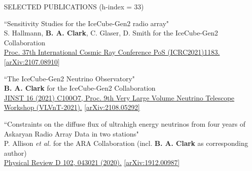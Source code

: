 \documentclass{resume} %
\begin{document}
\begin{rSection}{SELECTED PUBLICATIONS (h-index = 33)}
\begin{etaremune}

  \item ``Sensitivity Studies for the IceCube-Gen2 radio array" \\
 S. Hallmann, \textbf{B. A. Clark}, C. Glaser, D. Smith for the IceCube-Gen2 Collaboration \\ \href{https://doi.org/10.22323/1.395.1183}{Proc. 37th International Cosmic Ray Conference PoS (ICRC2021)1183.}  \href{https://arxiv.org/abs/2107.08910}{[arXiv:2107.08910]}


\item ``The IceCube-Gen2 Neutrino Observatory" \\
\textbf{B. A. Clark} for the IceCube-Gen2 Collaboration \\ \href{https://doi.org/10.1088/1748-0221/16/10/C10007}{JINST 16 (2021) C100O7, Proc. 9th Very Large Volume Neutrino Telescope Workshop (VLVnT-2021).}  \href{https://arxiv.org/abs/2108.05292}{[arXiv:2108.05292]}



  \item ``Constraints on the diffuse flux of ultrahigh energy neutrinos from four years of Askaryan Radio Array Data in two stations" \\
 P. Allison {\it et al.} for the ARA Collaboration (incl. \textbf{B. A. Clark} as corresponding author)\\ \href{https://doi.org/10.1103/PhysRevD.102.043021}{Physical Review D 102, 043021 (2020).}  \href{https://arxiv.org/abs/1912.00987}{[arXiv:1912.00987]}


\end{etaremune}
\end{rSection}
\end{document}
